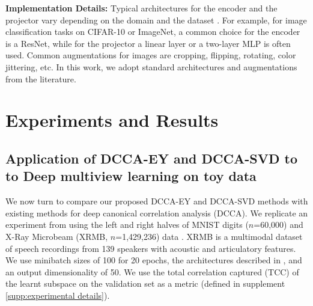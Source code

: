 \textbf{Implementation Details:} Typical architectures for the encoder and the projector vary depending on the domain and the dataset \cite{balestriero2023cookbook}. For example, for image classification tasks on CIFAR-10 or ImageNet, a common choice for the encoder is a ResNet, while for the projector a linear layer or a two-layer MLP is often used. Common augmentations for images are cropping, flipping, rotating, color jittering, etc. In this work, we adopt standard architectures and augmentations from the literature.


\section{Experiments and Results}

\subsection{Application of DCCA-EY and DCCA-SVD to to Deep multiview learning on toy data}

We now turn to compare our proposed DCCA-EY and DCCA-SVD methods with existing methods for deep canonical correlation analysis (DCCA). We replicate an experiment from \cite{wang2015stochastic} using the left and right halves of MNIST \cite{lecun1998gradient} digits ($n$=60,000) and X-Ray Microbeam (XRMB, $n$=1,429,236) data \cite{westbury1994x}. XRMB is a multimodal dataset of speech recordings from 139 speakers with acoustic and articulatory features. We use minibatch sizes of 100 for 20 epochs, the architectures described in \cite{wang2015stochastic}, and an output dimensionality of 50.  We use the total correlation captured (TCC) of the learnt subspace on the validation set as a metric (defined in supplement \ref{supp:experimental details}).

